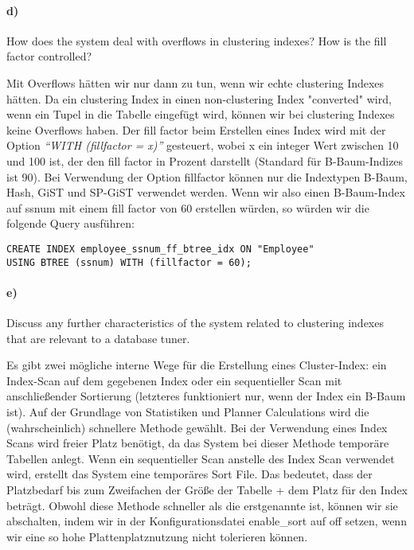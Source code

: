 \documentclass[11pt]{scrartcl}
\begin{document}
\paragraph{d)}

How does the system deal with overflows in clustering indexes? How is the fill factor controlled?

Mit Overflows hätten wir nur dann zu tun, wenn wir echte clustering Indexes hätten. Da ein clustering Index in einen non-clustering Index "converted" wird, wenn ein Tupel in die Tabelle eingefügt wird, können wir bei clustering Indexes keine Overflows haben.
Der fill factor beim Erstellen eines Index wird mit der Option \textit{“WITH (fillfactor = x)”} gesteuert, wobei x ein integer Wert zwischen 10 und 100 ist, der den fill factor in Prozent darstellt (Standard für B-Baum-Indizes ist 90).\newline
Bei Verwendung der Option fillfactor können nur die Indextypen B-Baum, Hash, GiST und SP-GiST verwendet werden. Wenn wir also einen B-Baum-Index auf ssnum mit einem fill factor von 60 erstellen würden, so würden wir die folgende Query ausführen:

\begin{lstlisting}[style=dbtsql]
CREATE INDEX employee_ssnum_ff_btree_idx ON "Employee" 
USING BTREE (ssnum) WITH (fillfactor = 60);
\end{lstlisting}

\paragraph{e)}

Discuss any further characteristics of the system related to clustering indexes that are relevant to a database tuner.

Es gibt zwei mögliche interne Wege für die Erstellung eines Cluster-Index: ein Index-Scan auf dem gegebenen Index oder ein sequentieller Scan mit anschließender Sortierung (letzteres funktioniert nur, wenn der Index ein B-Baum ist). Auf der Grundlage von Statistiken und Planner Calculations wird die (wahrscheinlich) schnellere Methode gewählt. Bei der Verwendung eines Index Scans wird freier Platz benötigt, da das System bei dieser Methode temporäre Tabellen anlegt. Wenn ein sequentieller Scan anstelle des Index Scan verwendet wird, erstellt das System eine temporäres Sort File. Das bedeutet, dass der Platzbedarf bis zum Zweifachen der Größe der Tabelle + dem Platz für den Index beträgt. Obwohl diese Methode schneller als die erstgenannte ist, können wir sie abschalten, indem wir in der Konfigurationsdatei enable\_sort auf off setzen, wenn wir eine so hohe Plattenplatznutzung nicht tolerieren können.
\end{document}
